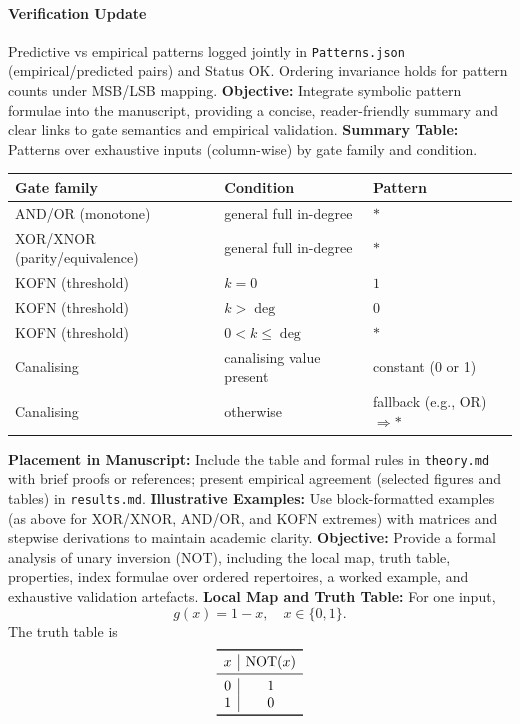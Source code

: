 \paragraph{Verification Update} Predictive vs empirical patterns logged jointly in \texttt{Patterns.json} (empirical/predicted pairs) and Status OK. Ordering invariance holds for pattern counts under MSB/LSB mapping.
\textbf{Objective:} Integrate symbolic pattern formulae into the manuscript, providing a concise, reader-friendly summary and clear links to gate semantics and empirical validation.
\textbf{Summary Table:} Patterns over exhaustive inputs (column-wise) by gate family and condition.
\begin{center}
\begin{tabular}{lll}
\toprule
\textbf{Gate family} & \textbf{Condition} & \textbf{Pattern} \\
\midrule
AND/OR (monotone) & general full in-degree & $*$ \\
XOR/XNOR (parity/equivalence) & general full in-degree & $*$ \\
KOFN (threshold) & $k=0$ & $1$ \\
KOFN (threshold) & $k>\deg$ & $0$ \\
KOFN (threshold) & $0<k\leq \deg$ & $*$ \\
Canalising & canalising value present & constant (0 or 1) \\
Canalising & otherwise & fallback (e.g., OR) \;$\Rightarrow$\;$*$ \\
\bottomrule
\end{tabular}
\end{center}
\textbf{Placement in Manuscript:} Include the table and formal rules in \texttt{theory.md} with brief proofs or references; present empirical agreement (selected figures and tables) in \texttt{results.md}.
\textbf{Illustrative Examples:} Use block-formatted examples (as above for XOR/XNOR, AND/OR, and KOFN extremes) with matrices and stepwise derivations to maintain academic clarity.
\textbf{Objective:} Provide a formal analysis of unary inversion (NOT), including the local map, truth table, properties, index formulae over ordered repertoires, a worked example, and exhaustive validation artefacts.
\textbf{Local Map and Truth Table:} For one input,
\[
g(x) = 1 - x,\quad x\in\{0,1\}.
\]
The truth table is
\[
\begin{array}{c|c}
\toprule
 x & \mathrm{NOT}(x) \\
\midrule
 0 & 1 \\
 1 & 0 \\
\bottomrule
\end{array}
\]
